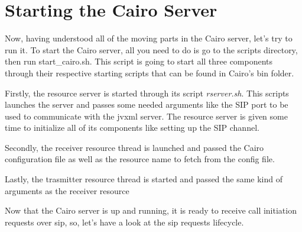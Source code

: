 \section{Starting the Cairo Server}
Now, having understood all of the moving parts in the Cairo server, let's try to run it.
To start the Cairo server, all you need to do is go to the scripts directory, then run start\_cairo.sh.
This script is going to start all three components through their respective starting scripts that can be found in Cairo's bin folder.

Firstly, the resource server is started through its script \textit{rserver.sh}.
This scripts launches the server and passes some needed arguments like the SIP port to be used to communicate with the \ac{jvxml} server.
The resource server is given some time to initialize all of its components like setting up the SIP channel.

Secondly, the receiver resource thread is launched and passed the Cairo configuration file as well as the resource name to fetch from the config file.

Lastly, the trasmitter resource thread is started and passed the same kind of arguments as the receiver resource

Now that the Cairo server is up and running, it is ready to receive call initiation requests over \ac{sip}, so, let's have a look at the \ac{sip} requests lifecycle.


